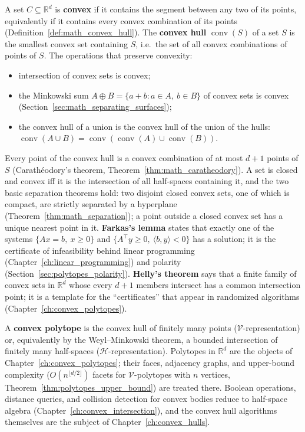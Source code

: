 A set $C \subseteq \mathbb{R}^d$ is \textbf{convex} if it contains the
segment between any two of its points, equivalently if it contains every
convex combination of its points (Definition~\ref{def:math_convex_hull}).
The \textbf{convex hull} $\operatorname{conv}(S)$ of a set $S$ is the
smallest convex set containing $S$, i.e.\ the set of all convex combinations
of points of $S$. The operations that preserve convexity:
\begin{itemize}
  \item intersection of convex sets is convex;
  \item the Minkowski sum $A \oplus B = \{ a + b : a \in A,\ b \in B \}$ of
    convex sets is convex (Section~\ref{sec:math_separating_surfaces});
  \item the convex hull of a union is the convex hull of the union of the
    hulls: $\operatorname{conv}(A \cup B) = \operatorname{conv}(\operatorname{conv}(A) \cup \operatorname{conv}(B))$.
\end{itemize}
Every point of the convex hull is a convex combination of at most $d+1$
points of $S$ (Carath\'eodory's theorem,
Theorem~\ref{thm:math_caratheodory}). A set is closed and convex iff it is
the intersection of all half-spaces containing it, and the two basic
separation theorems hold: two disjoint closed convex sets, one of which is
compact, are strictly separated by a hyperplane
(Theorem~\ref{thm:math_separation}); a point outside a closed convex set has
a unique nearest point in it. \textbf{Farkas's lemma} states that exactly one
of the systems $\{Ax = b,\ x \ge 0\}$ and $\{A^\top y \ge 0,\ \langle b,y\rangle < 0\}$
has a solution; it is the certificate of infeasibility behind linear
programming (Chapter~\ref{ch:linear_programming}) and polarity
(Section~\ref{sec:polytopes_polarity}). \textbf{Helly's theorem} says that a
finite family of convex sets in $\mathbb{R}^d$ whose every $d+1$ members
intersect has a common intersection point; it is a template for the
``certificates'' that appear in randomized algorithms
(Chapter~\ref{ch:convex_polytopes}).

A \textbf{convex polytope} is the convex hull of finitely many points
($\mathcal{V}$-representation) or, equivalently by the Weyl--Minkowski
theorem, a bounded intersection of finitely many half-spaces
($\mathcal{H}$-representation). Polytopes in $\mathbb{R}^d$ are the objects of
Chapter~\ref{ch:convex_polytopes}; their faces, adjacency graphs, and
upper-bound complexity ($O(n^{\lfloor d/2\rfloor})$ facets for
$\mathcal{V}$-polytopes with $n$ vertices,
Theorem~\ref{thm:polytopes_upper_bound}) are treated there. Boolean
operations, distance queries, and collision detection for convex bodies
reduce to half-space algebra (Chapter~\ref{ch:convex_intersection}), and the
convex hull algorithms themselves are the subject of
Chapter~\ref{ch:convex_hulls}.

